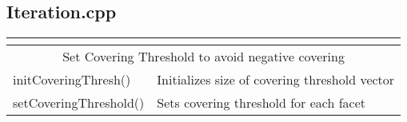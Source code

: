 \subsection{Iteration.cpp}
\begin{center}
\begin{tabular}{|l|l|}
\multicolumn{2}{l}{}\\[1ex]
\hline
\multicolumn{2}{|c|}{\rule{0pt}{3ex}Set Covering Threshold to avoid negative covering}\\
\hline
\rule{0pt}{3ex} initCoveringThresh()& Initializes size of covering threshold vector\\
\rule{0pt}{3ex} setCoveringThreshold()& Sets covering threshold for each facet\\
\hline
\end{tabular}
\end{center}

